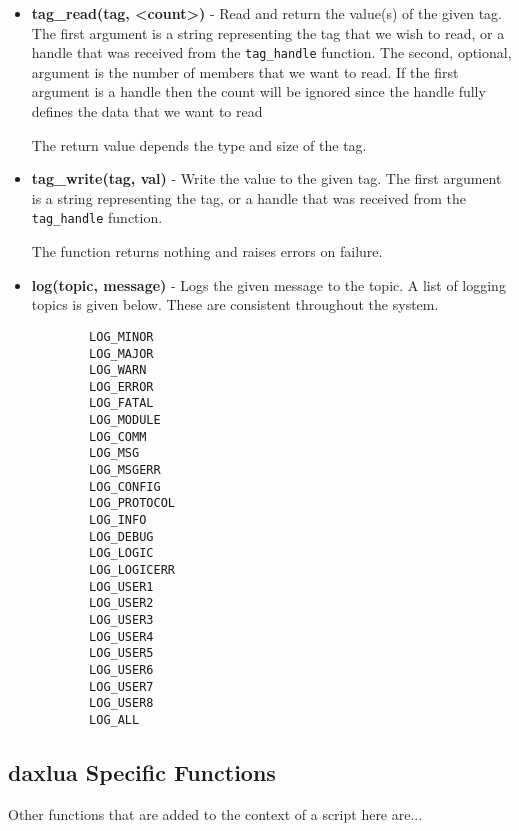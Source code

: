 \begin{itemize}
	\item \textbf{tag\_read(tag, <count>)} - Read and return the value(s) of
	the given tag.  The first argument is a
    string representing the tag that we wish to read, or a handle that was
    received from  the \texttt{tag\_handle} function.  The second, optional,
    argument is the number of members that we want to read.  If the first
    argument is a handle then the count will be ignored since the handle
    fully defines the data that we want to read

    The return value depends the type and size of the tag.

	\item \textbf{tag\_write(tag, val)} - Write the value to the given tag.
	The first argument is a string
    representing the tag, or a handle that was received from  the
    \texttt{tag\_handle} function.

    The function returns nothing and raises errors on failure.

	\item \textbf{log(topic, message)} - Logs the given message to the topic.
	A list of logging topics is given below.  These are consistent throughout
	the \opendax system.

    \begin{verbatim}
        LOG_MINOR
        LOG_MAJOR
        LOG_WARN
        LOG_ERROR
        LOG_FATAL
        LOG_MODULE
        LOG_COMM
        LOG_MSG
        LOG_MSGERR
        LOG_CONFIG
        LOG_PROTOCOL
        LOG_INFO
        LOG_DEBUG
        LOG_LOGIC
        LOG_LOGICERR
        LOG_USER1
        LOG_USER2
        LOG_USER3
        LOG_USER4
        LOG_USER5
        LOG_USER6
        LOG_USER7
        LOG_USER8
        LOG_ALL
    \end{verbatim}

\end{itemize}


\subsection{daxlua Specific Functions}

Other functions that are added to the context of a script here are...

